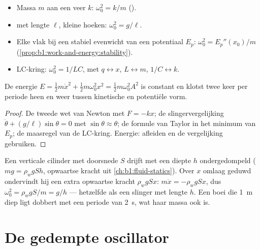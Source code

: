 \begin{proposition}\label{prop:b1:oscillators-resonance:sources}
\begin{itemize}
  \item Massa $m$ aan een veer $k$: $\omega_0^2 = k/m$ ().
  \item {} met lengte $\ell$, kleine hoeken: $\omega_0^2 = g/\ell$.
  \item Elke  vlak bij een stabiel evenwicht van een potentiaal $E_p$:
        $\omega_0^2 = E_p''(x_0)/m$ (\cref{prop:b1:work-and-energy:stability}).
  \item LC-kring: $\omega_0^2 = 1/LC$, met $q \leftrightarrow x$,
        $L \leftrightarrow m$, $1/C \leftrightarrow k$.
\end{itemize}
De energie $E = \tfrac12 m\dot x^2 + \tfrac12 m\omega_0^2x^2 = \tfrac12
m\omega_0^2A^2$ is constant en klotst twee keer per periode heen en weer tussen
kinetische en potentiële vorm.
\end{proposition}

\begin{proof}
De tweede wet van Newton met $F = -kx$; de slingervergelijking
$\ddot\theta + (g/\ell)\sin\theta = 0$ met $\sin\theta \approx \theta$;
de formule van Taylor in het minimum van $E_p$; de maasregel van de
LC-kring. Energie: afleiden en de vergelijking gebruiken.
\end{proof}

\begin{example}\label{ex:b1:oscillators-resonance:bob}
Een verticale cilinder met doorsnede $S$ drijft met een diepte $h$
ondergedompeld ($mg = \rho_wgSh$, opwaartse kracht uit \cref{ch:b1:fluid-statics}).
Over $x$ omlaag geduwd ondervindt hij een extra opwaartse kracht $\rho_wgSx$:
$m\ddot x = -\rho_wgSx$, dus $\omega_0^2 = \rho_wgS/m = g/h$ --- hetzelfde
als een slinger met lengte $h$. Een boei die \qty{1}{m} diep ligt dobbert met een
periode van \qty{2}{s}, wat haar massa ook is.
\end{example}

\section{De gedempte oscillator}

